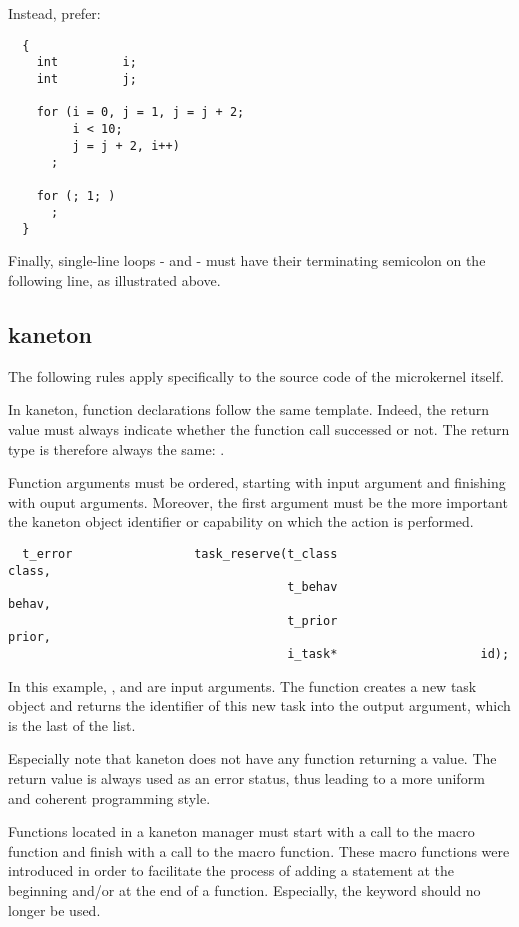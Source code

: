Instead, prefer:

\begin{verbatim}
  {
    int         i;
    int         j;

    for (i = 0, j = 1, j = j + 2;
         i < 10;
         j = j + 2, i++)
      ;

    for (; 1; )
      ;
  }
\end{verbatim}

Finally, single-line loops -  and  - must have
their terminating semicolon on the following line, as illustrated above.

%
%

\subsection{kaneton}

The following rules apply specifically to the source code of the microkernel
itself.

In kaneton, function declarations follow the same template. Indeed, the
return value must always indicate whether the function call successed or not.
The return type is therefore always the same: .

Function arguments must be ordered, starting with input argument and
finishing with ouput arguments. Moreover, the first argument must
be the more important \ie{} the kaneton object identifier or
capability on which the action is performed.

\begin{verbatim}
  t_error                 task_reserve(t_class                    class,
                                       t_behav                    behav,
                                       t_prior                    prior,
                                       i_task*                    id);
\end{verbatim}

In this example, ,  and  are
input arguments. The function creates a new task object and returns the
identifier of this new task into the  output argument, which
is the last of the list.

Especially note that kaneton does not have any function returning a value.
The return value is always used as an error status, thus leading to a more
uniform and coherent programming style.

Functions located in a kaneton manager must start with a call to the
 macro function and finish with a call to the 
macro function. These macro functions were introduced in order to
facilitate the process of adding a statement at the beginning and/or at
the end of a function. Especially, the  keyword should no
longer be used.

